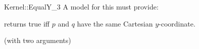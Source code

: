 \begin{ccRefFunctionObjectConcept}{Kernel::EqualY_3}
A model for this must provide:


{returns true iff $p$ and $q$ have the same Cartesian $y$-coordinate.}

\ccRefines
{} (with two arguments)

\ccSeeAlso
{}\\

\end{ccRefFunctionObjectConcept}
